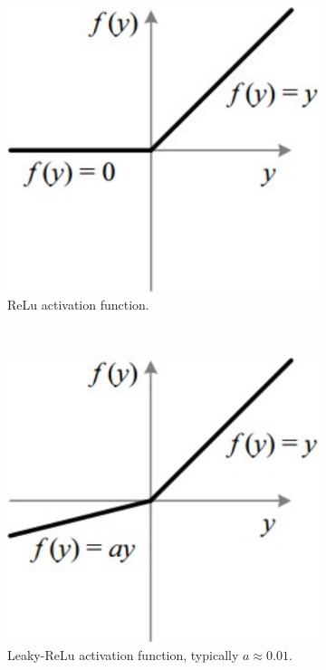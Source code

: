 \documentclass[12pt,onecolumn,letterpaper]{article}
\begin{document}
\begin{figure}[t!]
   \centering
   \begin{subfigure}[t]{0.2\textwidth}
       \centering
       \includegraphics[width=\linewidth]{figures/relu_activation_function.png}
       \caption{ReLu activation function.}
   \end{subfigure}
   ~
   \begin{subfigure}[t]{0.2\textwidth}
       \centering
       \includegraphics[width=\linewidth]{figures/leaky_relu_activation_function.png}
       \caption{Leaky-ReLu activation function, typically $a\approx0.01$.}
   \end{subfigure}
   \caption{}
   \label{fig:ReluAndLrActivationFunction}
\end{figure}
\end{document}
